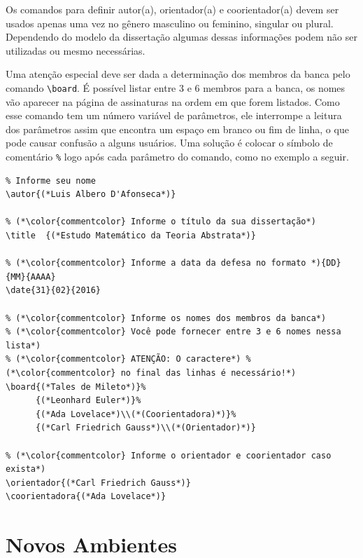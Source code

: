 \documentclass[fleqn]{profmat-cefet}
\begin{document}
Os comandos para definir autor(a), orientador(a) e coorientador(a) devem ser
usados apenas uma vez no gênero masculino ou feminino, singular ou plural.
Dependendo do modelo da dissertação algumas dessas informações podem não ser
utilizadas ou mesmo necessárias.

Uma atenção especial deve ser dada a determinação dos membros da banca pelo
comando \lstinline!\board!. É possível listar entre 3 e 6 membros para a banca,
os nomes vão aparecer na página de assinaturas na ordem em que forem listados.
Como esse comando tem um número variável de parâmetros, ele interrompe a leitura
dos parâmetros assim que encontra um espaço em branco ou fim de linha, o que
pode causar confusão a alguns usuários. Uma solução é colocar o símbolo de
comentário \lstinline{%}
logo após cada parâmetro do comando, como no exemplo a seguir.
    
\begin{lstlisting}
% Informe seu nome
\autor{(*Luis Albero D'Afonseca*)}

% (*\color{commentcolor} Informe o título da sua dissertação*)
\title  {(*Estudo Matemático da Teoria Abstrata*)}

% (*\color{commentcolor} Informe a data da defesa no formato *){DD}{MM}{AAAA}
\date{31}{02}{2016}

% (*\color{commentcolor} Informe os nomes dos membros da banca*)
% (*\color{commentcolor} Você pode fornecer entre 3 e 6 nomes nessa lista*)
% (*\color{commentcolor} ATENÇÃO: O caractere*) % (*\color{commentcolor} no final das linhas é necessário!*)
\board{(*Tales de Mileto*)}%
      {(*Leonhard Euler*)}%
      {(*Ada Lovelace*)\\(*(Coorientadora)*)}%
      {(*Carl Friedrich Gauss*)\\(*(Orientador)*)}

% (*\color{commentcolor} Informe o orientador e coorientador caso exista*)
\orientador{(*Carl Friedrich Gauss*)}
\coorientadora{(*Ada Lovelace*)}
\end{lstlisting}

\section{Novos Ambientes}
\label{sec:novos_ambientes}
\end{document}
